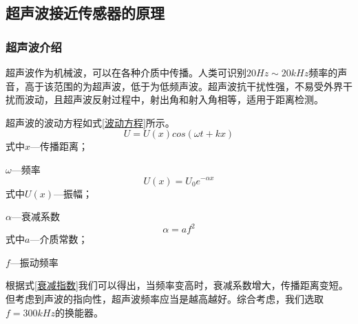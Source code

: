     \subsection{超声波接近传感器的原理}
    \subsubsection{超声波介绍}
      超声波作为机械波，可以在各种介质中传播。人类可识别$20Hz\sim20kHz$频率的声音，高于该范围的为超声波，低于为低频声波。超声波抗干扰性强，不易受外界干扰而波动，且超声波反射过程中，射出角和射入角相等，适用于距离检测。
      
      超声波的波动方程如式\ref{波动方程}所示。
    \begin{equation}
    	U=U(x)cos(\omega t+kx)
    	\label{波动方程}
    \end{equation}
	式中\quad$x$---传播距离；\par
	\quad$\omega$---频率
	\begin{equation}
		U(x)=U_0 e^{-\alpha x}
		\label{振幅方程}
	\end{equation}
	式中\quad$U(x)$---振幅；\par
		\quad$\alpha$---衰减系数
	\begin{equation}
		\alpha=a f^2
		\label{衰减指数}
	\end{equation}
	式中\quad $a$---介质常数；\par
	   \quad $f$---振动频率\par
    根据式\ref{衰减指数}我们可以得出，当频率变高时，衰减系数增大，传播距离变短。但考虑到声波的指向性，超声波频率应当是越高越好。综合考虑，我们选取$f=300kHz$的换能器。
